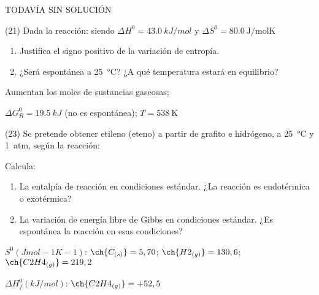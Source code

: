 \documentclass[10pt]{article}
\newenvironment{gexdatos}{
    \noindent\makebox[0pt][r]{\textit{Datos:}}
}{\vspace{5pt}}
\begin{document}
\begin{multicols}{2}
\begin{solution}[print=false]
  TODAVÍA SIN SOLUCIÓN
\end{solution}

\begin{exercise}
  (21) Dada la reacción: 
  siendo \( \Delta H^0 = \SI{43.0}{kJ/mol} \) y \( \Delta S^0 = \SI{80.0}{\joule\per\mole\kelvin} \) %

  \begin{enumerate}
    \item Justifica el signo positivo de la variación de entropía.
    \item ¿Será espontánea a \SI{25}{\celsius}? ¿A qué temperatura estará en
    equilibrio?
  \end{enumerate}
\end{exercise}

\begin{solution}
  \begin{enumerate*}
    \item Aumentan los moles de sustancias gaseosas; \item \( \Delta G^0_R = \SI{19.5}{kJ} \) (no es espontánea); \( T = \SI{538}{\kelvin} \)
  \end{enumerate*}
\end{solution}

\begin{exercise}
  (23) Se pretende obtener etileno (eteno) a partir de grafito e
  hidrógeno, a \SI{25}{\celsius} y \SI{1}{atm}, según la reacción:


  Calcula:

  \begin{enumerate}
    \item La entalpía de reacción en condiciones estándar. ¿La reacción es endotérmica o exotérmica?
    \item La variación de energía libre de Gibbs en condiciones
    estándar. ¿Es espontánea la reacción en esas condiciones?
  \end{enumerate}

  \begin{gexdatos}
    \( S^0 (J mol-1 K-1) \):
    \( \ch{C_{(s)}} = 5,70 \);
    \( \ch{H2_{(g)}} = 130,6 \);
    \( \ch{C2H4_{(g)}}= 219,2 \)

    \( \Delta H^0_f (\si{kJ/mol}) \):
    \( \ch{C2H4_{(g)}} = +52,5 \)
  \end{gexdatos}


\end{exercise}
\end{multicols}
\end{document}

